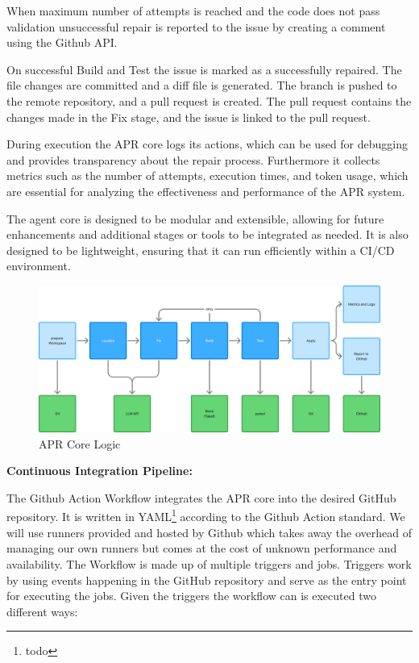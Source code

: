 When maximum number of attempts is reached and the code does not pass validation  unsuccessful repair is reported to the issue by creating a comment using the Github API.

On successful Build and Test the issue is marked as a successfully repaired. The file changes are committed and a diff file is generated. The branch is pushed to the remote repository, and a pull request is created. The pull request contains the changes made in the Fix stage, and the issue is linked to the pull request.

During execution the APR core logs its actions, which can be used for debugging and provides transparency about the repair process. Furthermore it collects metrics such as the number of attempts, execution times, and token usage, which are essential for analyzing the effectiveness and performance of the APR system.

The agent core is designed to be modular and extensible, allowing for future enhancements and additional stages or tools to be integrated as needed. It is also designed to be lightweight, ensuring that it can run efficiently within a CI/CD environment.

\begin{figure}[H]
    \centering
    \includegraphics[width=1\textwidth]{images/flowcharts/apr-core.png}
    \caption{APR Core Logic}
    \label{fig:apr-core}
\end{figure}

\textbf{Continuous Integration Pipeline:}

The Github Action Workflow integrates the APR core into the desired GitHub repository. It is written in YAML\footnote{todo} according to the Github Action standard. %
We will use runners provided and hosted by Github which takes away the overhead of managing our own runners but comes at the cost of unknown performance and availability. %
The Workflow is made up of multiple triggers and jobs. Triggers work by using events happening in the GitHub repository and serve as the entry point for executing the jobs. Given the triggers the workflow can is executed two different ways:

